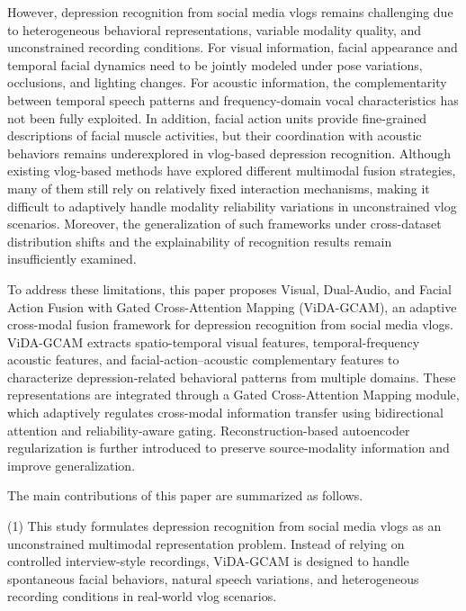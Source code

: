 \documentclass[a4paper,fleqn]{cas-dc}
\begin{document}
However, depression recognition from social media vlogs remains challenging due to heterogeneous behavioral representations, variable modality quality, and unconstrained recording conditions.
For visual information, facial appearance and temporal facial dynamics need to be jointly modeled under pose variations, occlusions, and lighting changes\cite{visual:challenge}. For acoustic information, the complementarity between temporal speech patterns and frequency-domain vocal characteristics has not been fully exploited\cite{audio:challenge}. In addition, facial action units provide fine-grained descriptions of facial muscle activities, but their coordination with acoustic behaviors remains underexplored in vlog-based depression recognition. Although existing vlog-based methods have explored different multimodal fusion strategies\cite{model:TFN, model:TAMFN, model:CAIINET, model:STST, model:MDAVIF,visual:challenge,audio:challenge,model:DepMamba,model:DepMPK,model:AttMamba}, many of them still rely on relatively fixed interaction mechanisms, making it difficult to adaptively handle modality reliability variations in unconstrained vlog scenarios.  Moreover, the generalization of such frameworks under cross-dataset distribution shifts and the explainability of recognition results remain insufficiently examined.

To address these limitations, this paper proposes Visual, Dual-Audio, and Facial Action Fusion with Gated Cross-Attention Mapping (ViDA-GCAM), an adaptive cross-modal fusion framework for depression recognition from social media vlogs. ViDA-GCAM extracts spatio-temporal visual features, temporal-frequency acoustic features, and facial-action–acoustic complementary features to characterize depression-related behavioral patterns from multiple domains. These representations are integrated through a Gated Cross-Attention Mapping module, which adaptively regulates cross-modal information transfer using bidirectional attention and reliability-aware gating. Reconstruction-based autoencoder regularization is further introduced to preserve source-modality information and improve generalization.

The main contributions of this paper are summarized as follows.

(1) This study formulates depression recognition from social media vlogs as an unconstrained multimodal representation problem. Instead of relying on controlled interview-style recordings, ViDA-GCAM is designed to handle spontaneous facial behaviors, natural speech variations, and heterogeneous recording conditions in real-world vlog scenarios.
\end{document}
